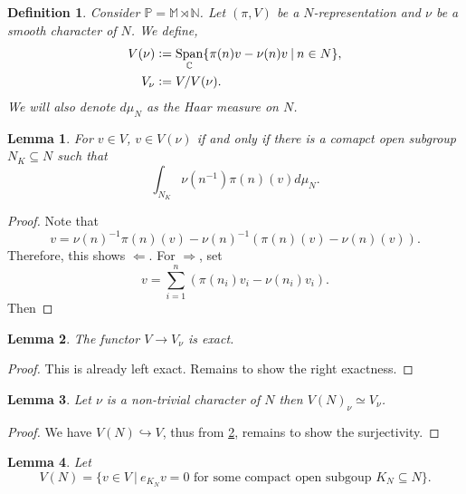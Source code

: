 \documentclass[8pt]{article}
\newtheorem{definition}{Definition}[section]
\newtheorem{lemma}{Lemma}[section]
\DeclareMathOperator{\Span}{Span}
\newcommand{\defeq}{\vcentcolon=}
\newcommand{\N}[0]{\mathbb{N}}
\newcommand{\C}[0]{\mathbb{C}}
\newcommand{\Para}[0]{\mathbb{P}}
\newcommand{\M}[0]{\mathbb{M}}
\newcommand{\sep}[0]{\:|\:}
\begin{document}
\setcounter{claim}{0}

\begin{definition}
  Consider $\Para = \M\rtimes\N$. Let $(\pi,V)$ be a $N$-representation and $\nu$ be a smooth character of $N$. We define,
  \begin{align*}
    V(\nu) & \defeq \Span_\C\{\pi(n)v-\nu(n)v\sep n\in N\},\\
    V_\nu & \defeq V/V(\nu).
  \end{align*}
  We will also denote $d\mu_N$ as the Haar measure on $N$.
\end{definition}

\begin{lemma}
  For $v\in V$, $v\in V(\nu)$ if and only if there is a comapct open subgroup $N_K\subseteq N$ such that 
  \begin{equation*}
    \int_{N_K}\nu(n^{-1})\pi(n)(v)d\mu_N.
  \end{equation*}
  \label{lemma_44_1}
\end{lemma}
\begin{proof}
  Note that 
  \begin{equation*}
    v = \nu(n)^{-1}\pi(n)(v)-\nu(n)^{-1}(\pi(n)(v)-\nu(n)(v)).
  \end{equation*}
  Therefore, this shows $\Leftarrow$. For $\Rightarrow$, set 
  \begin{equation*}
    v = \sum_{i=1}^n (\pi(n_i)v_i-\nu(n_i)v_i).
  \end{equation*}
  Then %
\end{proof}

\begin{lemma}
  \label{lemma_44_2}
  The functor $V\to V_\nu$ is exact.
\end{lemma}
\begin{proof}
  This is already left exact. Remains to show the right exactness. %
\end{proof}

\begin{lemma}
Let $\nu$ is a non-trivial character of $N$ then $V(N)_\nu\simeq V_\nu$. 
\end{lemma}
\begin{proof}
  We have $V(N)\hookrightarrow V$, thus from \ref{lemma_44_2}, remains to show the surjectivity.
\end{proof}
\begin{lemma}
  \label{lemma_44}
  Let 
  \begin{equation*}
  V(N) = \{v\in V\sep e_{K_N}v = 0\text{ for some compact open subgoup }K_N\subseteq N\}.
  \end{equation*}
\end{lemma}
\end{document}
